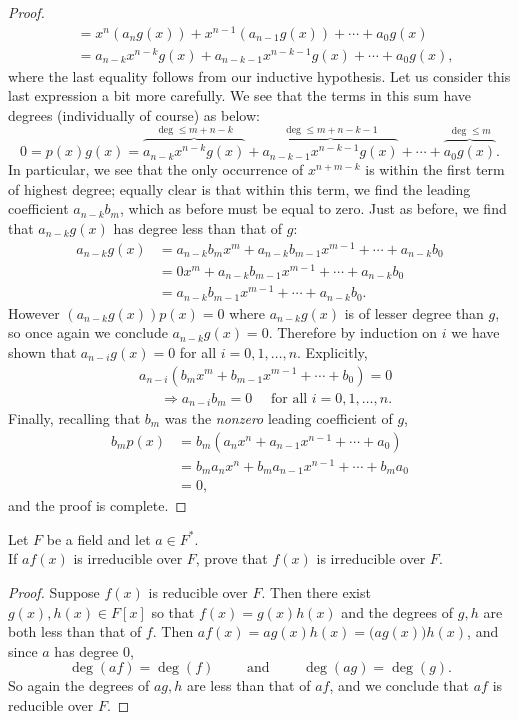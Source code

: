 \documentclass{article}
\newenvironment{problem2}[1]{\noindent {\bf (#1}}
{\medskip}
\newenvironment{problem1}[1]{\noindent {\bf Problem #1:}}
{\medskip}
\begin{document}
\begin{problem1}{4}
\begin{proof}
\begin{align*}
&=x^n(a_ng(x))+x^{n-1}(a_{n-1}g(x))+\cdots+a_0g(x)\\ &= a_{n-k}x^{n-k}g(x)+a_{n-k-1}x^{n-k-1}g(x)+\cdots+a_0g(x),\end{align*} where the last equality follows from our inductive hypothesis. Let us consider this last expression a bit more carefully. We see that the terms in this sum have degrees (individually of course) as below: 
$$0=p(x)g(x)=\overbrace{ a_{n-k}x^{n-k}g(x)}^{\deg \le m+n-k}+\overbrace{a_{n-k-1}x^{n-k-1}g(x)}^{\deg\le m+n-k-1}+\cdots+\overbrace{a_0g(x)}^{\deg\le m}.$$ In particular, we see that the only occurrence of $x^{n+m-k}$ is within the first term of highest degree; equally clear is that within this term, we find the leading coefficient $a_{n-k}b_m$, which as before must be equal to zero. Just as before, we find that $a_{n-k}g(x)$ has degree less than that of $g$: \begin{align*}a_{n-k}g(x)&=a_{n-k}b_mx^m+a_{n-k}b_{m-1}x^{m-1}+\cdots+a_{n-k}b_0\\&=0x^m+a_{n-k}b_{m-1}x^{m-1}+\cdots+a_{n-k}b_0\\ &=a_{n-k}b_{m-1}x^{m-1}+\cdots+a_{n-k}b_0.\end{align*} However $(a_{n-k}g(x))p(x)=0$ where $a_{n-k}g(x)$ is of lesser degree than $g$, so once again we conclude $a_{n-k}g(x)=0$. Therefore by induction on $i$ we have shown that $a_{n-i}g(x)=0$ for all $i=0,1,\ldots,n$. Explicitly, \begin{align*} &a_{n-i}(b_mx^m+b_{m-1}x^{m-1}+\cdots+b_0)=0\\
&\phantom{111}\Longrightarrow a_{n-i}b_m=0\quad\text{ for all $i=0,1,\ldots,n$.}
\end{align*}
Finally, recalling that $b_m$ was the \emph{nonzero} leading coefficient of $g$,\begin{align*}b_mp(x)&=b_m(a_nx^n+a_{n-1}x^{n-1}+\cdots+a_0)\\
&=b_ma_nx^n+b_ma_{n-1}x^{n-1}+\cdots+b_ma_0\\
&=0,\end{align*} and the proof is complete.\end{proof}
\end{problem1}

\begin{problem1}{5} Let $F$ be a field and let $a\in F^*$. \end{problem1}\\

\begin{problem2}{a)} If $af(x)$ is irreducible over $F$, prove that $f(x)$ is irreducible over $F$.
\begin{proof} Suppose $f(x)$ is reducible over $F$. Then there exist $g(x),h(x)\in F[x]$ so that $f(x)=g(x)h(x)$ and the degrees of $g,h$ are both less than that of $f$. Then $af(x)=ag(x)h(x)=\big(ag(x)\big)h(x)$, and since $a$ has degree 0, $$\deg(af)=\deg(f)\quad\quad \text{ and } \quad\quad \deg(ag)=\deg(g).$$ So again the degrees of $ag, h$ are less than that of $af$, and we conclude that $af$ is reducible over $F$.
\end{proof}\end{problem2}
\end{document}

